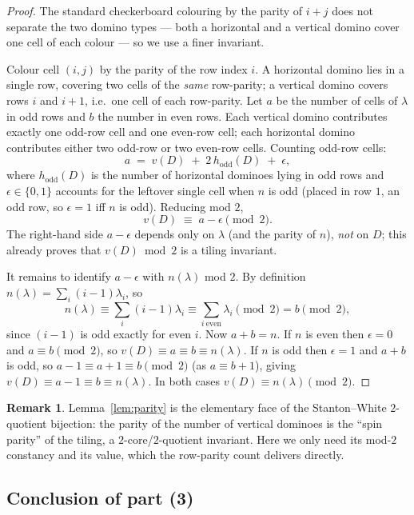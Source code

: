 \documentclass[11pt]{article}
\theoremstyle{definition}
\newtheorem{remark}{Remark}
\begin{document}
\begin{proof}
The standard checkerboard colouring by the parity of $i+j$ does not separate the
two domino types --- both a horizontal and a vertical domino cover one cell of
each colour --- so we use a finer invariant.

Colour cell $(i,j)$ by the parity of the row index $i$.  A horizontal
domino lies in a single row, covering two cells of the \emph{same} row-parity; a
vertical domino covers rows $i$ and $i+1$, i.e.\ one cell of each row-parity.  Let
$a$ be the number of cells of $\lambda$ in odd rows and $b$ the number in even
rows.  Each vertical domino contributes exactly one odd-row cell and one
even-row cell; each horizontal domino contributes either two odd-row or two
even-row cells.  Counting odd-row cells:
\[
a \;=\; v(D)\;+\;2\,h_{\mathrm{odd}}(D)\;+\;\epsilon,
\]
where $h_{\mathrm{odd}}(D)$ is the number of horizontal dominoes lying in odd
rows and $\epsilon\in\{0,1\}$ accounts for the leftover single cell when $n$ is
odd (placed in row $1$, an odd row, so $\epsilon=1$ iff $n$ is odd).  Reducing
mod $2$,
\[
v(D)\;\equiv\;a-\epsilon\pmod 2 .
\]
The right-hand side $a-\epsilon$ depends only on $\lambda$ (and the parity of
$n$), \emph{not} on $D$; this already proves that $v(D)\bmod2$ is a tiling
invariant.

It remains to identify $a-\epsilon$ with $n(\lambda)$ mod $2$.  By definition
$n(\lambda)=\sum_i(i-1)\lambda_i$, so
\[
n(\lambda)\equiv\sum_{i}(i-1)\lambda_i
\equiv\sum_{i\ \mathrm{even}}\lambda_i\pmod 2
= b \pmod 2,
\]
since $(i-1)$ is odd exactly for even $i$.  Now $a+b=n$.  If $n$ is even then
$\epsilon=0$ and $a\equiv b\pmod2$, so $v(D)\equiv a\equiv b\equiv n(\lambda)$.
If $n$ is odd then $\epsilon=1$ and $a+b$ is odd, so $a-1\equiv a+1\equiv b
\pmod 2$ (as $a\equiv b+1$), giving $v(D)\equiv a-1\equiv b\equiv n(\lambda)$.
In both cases $v(D)\equiv n(\lambda)\pmod 2$.
\end{proof}

\begin{remark}
Lemma~\ref{lem:parity} is the elementary face of the Stanton--White
$2$-quotient bijection: the parity of the number of vertical dominoes is the
``spin parity'' of the tiling, a $2$-core/$2$-quotient invariant.  Here we only
need its mod-$2$ constancy and its value, which the row-parity count delivers
directly.
\end{remark}

\subsection{Conclusion of part (3)}
\end{document}
